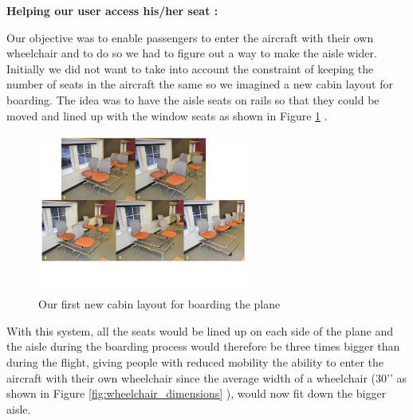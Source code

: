 




\newpage

\textbf{Helping our user access his/her seat :}

Our objective was to enable passengers to enter the aircraft with their own wheelchair and to do so we had to figure out a way to make the aisle wider. Initially we did not want to take into account the constraint of keeping the number of seats in the aircraft the same so we imagined a new cabin layout for boarding. The idea was to have the aisle seats on rails so that they could be moved and lined up with the window seats as shown in Figure \ref{fig:first_new_cabin_layout} . 

\begin{figure}[h]
  \centering
     \includegraphics[width=7cm]{images/first_new_cabin_layout.png}
   \caption{Our first new cabin layout for boarding the plane}
  \label{fig:first_new_cabin_layout}
\end{figure} 

With this system, all the seats would be lined up on each side of the plane and the aisle during the boarding process would therefore be three times bigger than during the flight, giving people with reduced mobility the ability to enter the aircraft with their own wheelchair since the average width of a wheelchair (30’’ as shown in Figure \ref{fig:wheelchair_dimensions} ), would now fit down the bigger aisle. 

